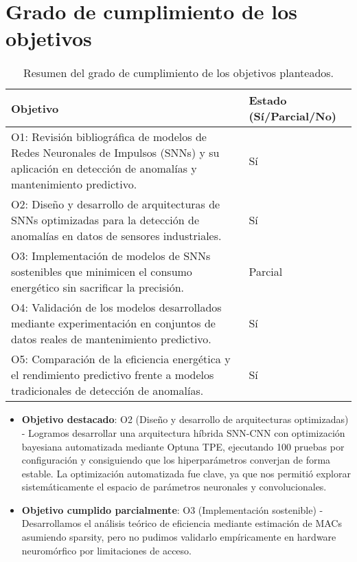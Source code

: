 \section{Grado de cumplimiento de los objetivos}
\begin{table}[htbp]
    \centering
    \small
    \begin{tabular}{p{}p{}}
        \hline\hline
        \textbf{Objetivo} & \textbf{Estado (Sí/Parcial/No)} \\
        \hline
        O1: Revisión bibliográfica de modelos de Redes Neuronales de Impulsos (SNNs) y su aplicación en detección de anomalías y mantenimiento predictivo. & Sí \\
        O2: Diseño y desarrollo de arquitecturas de SNNs optimizadas para la detección de anomalías en datos de sensores industriales. & Sí \\
        O3: Implementación de modelos de SNNs sostenibles que minimicen el consumo energético sin sacrificar la precisión. & Parcial \\
        O4: Validación de los modelos desarrollados mediante experimentación en conjuntos de datos reales de mantenimiento predictivo. & Sí \\
        O5: Comparación de la eficiencia energética y el rendimiento predictivo frente a modelos tradicionales de detección de anomalías. & Sí \\ 
        \hline\hline
    \end{tabular}
    \caption{Resumen del grado de cumplimiento de los objetivos planteados.}
    \label{tab:objetivos-cumplimiento}
\end{table}


\begin{itemize}
    \item \textbf{Objetivo destacado}: O2 (Diseño y desarrollo de arquitecturas optimizadas) - Logramos desarrollar una arquitectura híbrida SNN-CNN con optimización bayesiana automatizada mediante Optuna TPE, ejecutando 100 pruebas por configuración y consiguiendo que los hiperparámetros converjan de forma estable. La optimización automatizada fue clave, ya que nos permitió explorar sistemáticamente el espacio de parámetros neuronales y convolucionales.
    \item \textbf{Objetivo cumplido parcialmente}: O3 (Implementación sostenible) - Desarrollamos el análisis teórico de eficiencia mediante estimación de MACs asumiendo sparsity, pero no pudimos validarlo empíricamente en hardware neuromórfico por limitaciones de acceso.
\end{itemize}

